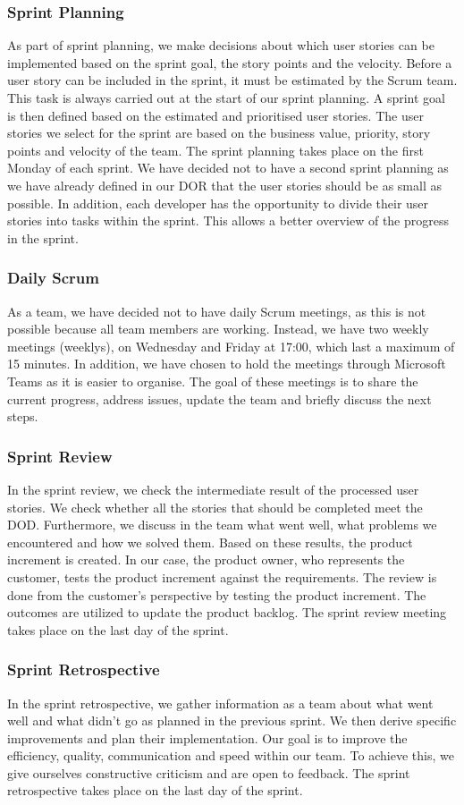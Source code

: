 \subsubsection{Sprint Planning}
As part of sprint planning, we make decisions about which user stories can be implemented based on the sprint goal, the story points and the velocity.
Before a user story can be included in the sprint, it must be estimated by the Scrum team. This task is always carried out at the start of our sprint planning.
A sprint goal is then defined based on the estimated and prioritised user stories.
The user stories we select for the sprint are based on the business value, priority, story points and velocity of the team.
The sprint planning takes place on the first Monday of each sprint.
We have decided not to have a second sprint planning as we have already defined in our DOR that the user stories should be as small as possible. In addition, each developer has the opportunity to divide their user stories into tasks within the sprint. This allows a better overview of the progress in the sprint.

\subsubsection{Daily Scrum}
As a team, we have decided not to have daily Scrum meetings, as this is not possible because all team members are working. Instead, we have two weekly meetings (weeklys), on Wednesday and Friday at 17:00, which last a maximum of 15 minutes.
In addition, we have chosen to hold the meetings through Microsoft Teams as it is easier to organise.
The goal of these meetings is to share the current progress, address issues, update the team and briefly discuss the next steps.

\subsubsection{Sprint Review}
In the sprint review, we check the intermediate result of the processed user stories. We check whether all the stories that should be completed meet the DOD. Furthermore, we discuss in the team what went well, what problems we encountered and how we solved them. Based on these results, the product increment is created.
In our case, the product owner, who represents the customer, tests the product increment against the requirements. The review is done from the customer's perspective by testing the product increment. The outcomes are utilized to update the product backlog.
The sprint review meeting takes place on the last day of the sprint.

\subsubsection{Sprint Retrospective}
In the sprint retrospective, we gather information as a team about what went well and what didn't go as planned in the previous sprint.
We then derive specific improvements and plan their implementation. Our goal is to improve the efficiency, quality, communication and speed within our team. To achieve this, we give ourselves constructive criticism and are open to feedback.
The sprint retrospective takes place on the last day of the sprint.